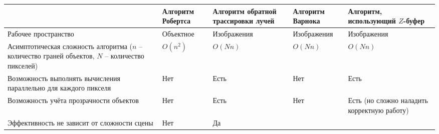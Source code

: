 \noindent
\begin{adjustbox}{width=1\textwidth}
    \begin{tabular}{|p{}|p{}|p{}|p{}|p{}|}
        \hline
        &
        Алгоритм Робертса
        &
        Алгоритм обратной трассировки лучей
        &
        Алгоритм Варнока
        &
        Алгоритм, использующий $Z$-буфер
        \\
        \hline
        Рабочее пространство
        &
        Объектное
        &
        Изображения
        &
        Изображения
        &
        Изображения
        \\
        \hline
        Асимптотическая сложность алгоритма ($n$ -- количество граней объектов,
        $N$ -- количество пикселей)
        &
        \cellcolor{yellow!10}
        $O(n^2)$
        &
        \cellcolor{yellow!10}
        $O(Nn)$
        &
        \cellcolor{yellow!10}
        $O(Nn)$
        &
        \cellcolor{yellow!10}
        $O(Nn)$
        \\
        \hline
        Возможность выполнять вычисления параллельно для каждого пикселя
        &
        \cellcolor{red!10}
        Нет
        &
        \cellcolor{green!10}
        Есть
        &
        \cellcolor{red!10}
        Нет
        &
        \cellcolor{green!10}
        Есть
        \\
        \hline
        Возможность учёта прозрачности объектов
        &
        \cellcolor{red!10}
        Нет
        &
        \cellcolor{green!10}
        Есть 
        &
        \cellcolor{red!10}
        Нет
        &
        \cellcolor{yellow!10}
        Есть (но сложно наладить корректную работу)
        \\
        \hline
        Эффективность не зависит от сложности сцены
        &
        \cellcolor{red!10}
        Нет
        &
        \cellcolor{green!10}
        Да

\end{tabular}
\end{adjustbox}
